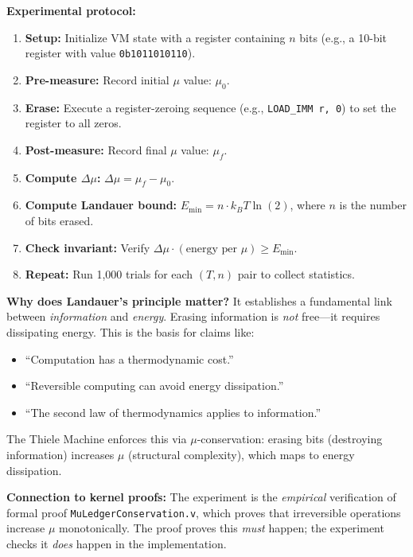 \textbf{Experimental protocol:}
\begin{enumerate}
    \item \textbf{Setup:} Initialize VM state with a register containing $n$ bits (e.g., a 10-bit register with value \texttt{0b1011010110}).
    
    \item \textbf{Pre-measure:} Record initial $\mu$ value: $\mu_0$.
    
    \item \textbf{Erase:} Execute a register-zeroing sequence (e.g., \texttt{LOAD\_IMM r, 0}) to set the register to all zeros.
    
    \item \textbf{Post-measure:} Record final $\mu$ value: $\mu_f$.
    
    \item \textbf{Compute $\Delta\mu$:} $\Delta\mu = \mu_f - \mu_0$.
    
    \item \textbf{Compute Landauer bound:} $E_{\text{min}} = n \cdot k_B T \ln(2)$, where $n$ is the number of bits erased.
    
    \item \textbf{Check invariant:} Verify $\Delta\mu \cdot (\text{energy per } \mu) \geq E_{\text{min}}$.
    
    \item \textbf{Repeat:} Run 1,000 trials for each $(T, n)$ pair to collect statistics.
\end{enumerate}

\textbf{Why does Landauer's principle matter?} It establishes a fundamental link between \textit{information} and \textit{energy}. Erasing information is \textit{not} free---it requires dissipating energy. This is the basis for claims like:
\begin{itemize}
    \item ``Computation has a thermodynamic cost.''
    \item ``Reversible computing can avoid energy dissipation.''
    \item ``The second law of thermodynamics applies to information.''
\end{itemize}
The Thiele Machine enforces this via $\mu$-conservation: erasing bits (destroying information) increases $\mu$ (structural complexity), which maps to energy dissipation.

\textbf{Connection to kernel proofs:} The experiment is the \textit{empirical} verification of formal proof \texttt{MuLedgerConservation.v}, which proves that irreversible operations increase $\mu$ monotonically. The proof proves this \textit{must} happen; the experiment checks it \textit{does} happen in the implementation.

